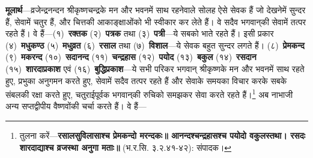 \begin{sloppypar}\justifying{}
\textbf{मूलार्थ}—व्रजेन्द्रनन्दन श्रीकृष्णचन्द्रके मन और भवनमें साथ रहनेवाले सोलह ऐसे सेवक हैं जो देखनेमें सुन्दर हैं, सेवामें चतुर हैं, और चित्तकी आकाङ्क्षाओंको भी स्वीकार कर लेते हैं। वे सदैव भगवान्‌की सेवामें तत्पर रहते हैं। वे हैं—(१)~\textbf{रक्तक} (२)~\textbf{पत्रक} तथा (३)~\textbf{पत्री}—ये सबको भाते रहते हैं। इसी प्रकार (४)~\textbf{मधुकण्ठ} (५)~\textbf{मधुव्रत} (६)~\textbf{रसाल} तथा (७)~\textbf{विशाल}—ये सेवक बहुत सुन्दर लगते हैं। (८)~\textbf{प्रेमकन्द} (९)~\textbf{मकरन्द} (१०)~\textbf{सदानन्द} (११)~\textbf{चन्द्रहास} (१२)~\textbf{पयोद} (१३)~\textbf{बकुल} (१४)~\textbf{रसदान} (१५)~\textbf{शारदाप्रकाश} एवं (१६)~\textbf{बुद्धिप्रकाश}—ये सभी परिकर भगवान् श्रीकृष्णके मन और भवनमें साथ रहते हुए, प्रभुका अनुगमन करते हुए, सेवामें सदैव तत्पर रहते हैं और सेवाके समयका विचार करके सबके संबलकी रक्षा करते हुए, चतुराईपूर्वक भगवान्‌की रुचिको समझकर सेवा करते रहते हैं।\footnote{तुलना करें—\textbf{रसालसुविलासाश्च प्रेमकन्दो मरन्दकः॥ आनन्दश्चन्द्रहासश्च पयोदो वकुलस्तथा। रसदः शारदाद्याश्च व्रजस्था अनुगा मताः॥} (भ.र.सि. ३.२.४१-४२): संपादक।}
अब नाभाजी अन्य सप्तद्वीपीय वैष्णवोंकी चर्चा करते हैं। वे हैं—
\end{sloppypar}


